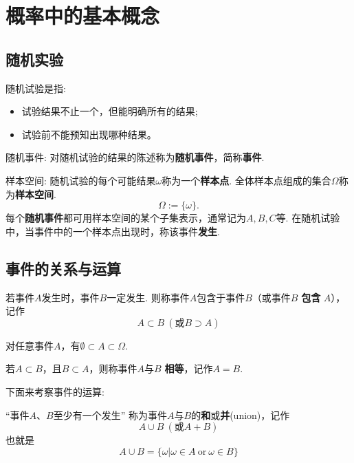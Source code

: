 \section{概率中的基本概念}
\subsection{随机实验}

\begin{definition}
    随机试验是指:
    \begin{itemize}
        \item 试验结果不止一个，但能明确所有的结果;
        \item 试验前不能预知出现哪种结果。
    \end{itemize}
\end{definition}

\begin{definition}
    随机事件: 对随机试验的结果的陈述称为\textbf{随机事件}，简称\textbf{事件}.
\end{definition}

\begin{definition}
    样本空间: 随机试验的每个可能结果$\omega$称为一个\textbf{样本点}. 全体样本点组成的集合$\Omega$称为\textbf{样本空间}.
    $$
        \Omega:=\{\omega\}.
    $$
    每个\textbf{随机事件}都可用样本空间的某个子集表示，通常记为$A, B, C$等.
    在随机试验中，当事件中的一个样本点出现时，称该事件\textbf{发生}.
\end{definition}

\subsection{事件的关系与运算}

\begin{definition}[事件的关系]
    若事件$A$发生时，事件$B$一定发生. 则称事件$A$包含于事件$B$（或事件$B$ \textbf{包含} $A$），记作
    $$A\subset B \ (\text{或}B\supset A)$$

    对任意事件$A$，有$\emptyset \subset A\subset \Omega$.

    若$A\subset B$，且$B\subset A$，则称事件$A$与$B$ \textbf{相等}，记作$A=B$.

\end{definition}

下面来考察事件的运算:

\begin{definition}[事件的并]

    “事件$A$、$B$至少有一个发生”
    称为事件$A$与$B$的\textbf{和}或\textbf{并}(union)，记作
    $$A\cup B \ (\text{或}A+B)$$
    也就是
    $$A\cup B=\{\omega | \omega\in A \ \text{or}\ \omega\in B\}$$
\end{definition}

